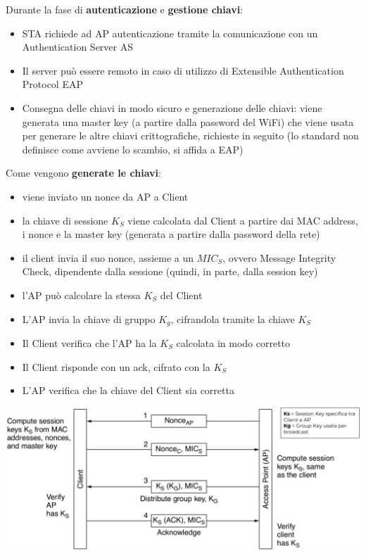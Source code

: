 Durante la fase di \textbf{autenticazione} e \textbf{gestione chiavi}: 
\begin{itemize}
	\item STA richiede ad AP autenticazione tramite la comunicazione con un Authentication Server AS
	
    \item Il server può essere remoto in caso di utilizzo di Extensible Authentication Protocol EAP
	
    \item Consegna delle chiavi in modo sicuro e generazione delle chiavi: viene generata una master key (a partire dalla password del WiFi) che viene usata per generare le altre chiavi crittografiche, richieste in seguito (lo standard non definisce come avviene lo scambio, si affida a EAP)
\end{itemize}

Come vengono \textbf{generate le chiavi}:
\begin{itemize}
	\item viene inviato un nonce da AP a Client

	\item la chiave di sessione $K_S$ viene calcolata dal Client a partire dai MAC address, i nonce e la master key (generata a partire dalla password della rete)

	\item il client invia il suo nonce, assieme a un $MIC_S$, ovvero Message Integrity Check, dipendente dalla sessione (quindi, in parte, dalla session key)

	\item l'AP può calcolare la stessa $K_S$ del Client

	\item L'AP invia la chiave di gruppo $K_g$, cifrandola tramite la chiave $K_S$

	\item Il Client verifica che l'AP ha la $K_S$ calcolata in modo corretto

	\item Il Client risponde con un ack, cifrato con la $K_S$

	\item L'AP verifica che la chiave del Client sia corretta
\end{itemize}
\begin{center}
	\includegraphics[width=0.98\linewidth]{img/wlan/keygen}
\end{center}

